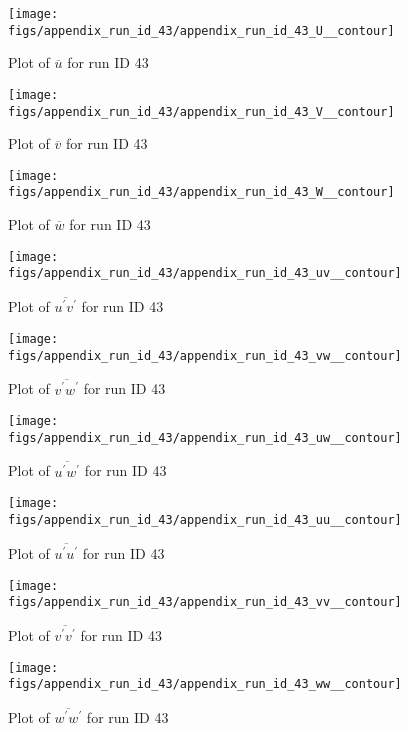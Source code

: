 \begin{figure}[H]
\centering
\texttt{[image: figs/appendix\_run\_id\_43/appendix\_run\_id\_43\_U\_\_contour]}
\caption{Plot of $\overline{u}$ for run ID 43}
\label{fig:appendix_run_id_43_U__contour}
\end{figure}


\begin{figure}[H]
\centering
\texttt{[image: figs/appendix\_run\_id\_43/appendix\_run\_id\_43\_V\_\_contour]}
\caption{Plot of $\overline{v}$ for run ID 43}
\label{fig:appendix_run_id_43_V__contour}
\end{figure}


\begin{figure}[H]
\centering
\texttt{[image: figs/appendix\_run\_id\_43/appendix\_run\_id\_43\_W\_\_contour]}
\caption{Plot of $\overline{w}$ for run ID 43}
\label{fig:appendix_run_id_43_W__contour}
\end{figure}


\begin{figure}[H]
\centering
\texttt{[image: figs/appendix\_run\_id\_43/appendix\_run\_id\_43\_uv\_\_contour]}
\caption{Plot of $\overline{u^\prime v^\prime}$ for run ID 43}
\label{fig:appendix_run_id_43_uv__contour}
\end{figure}


\begin{figure}[H]
\centering
\texttt{[image: figs/appendix\_run\_id\_43/appendix\_run\_id\_43\_vw\_\_contour]}
\caption{Plot of $\overline{v^\prime w^\prime}$ for run ID 43}
\label{fig:appendix_run_id_43_vw__contour}
\end{figure}


\begin{figure}[H]
\centering
\texttt{[image: figs/appendix\_run\_id\_43/appendix\_run\_id\_43\_uw\_\_contour]}
\caption{Plot of $\overline{u^\prime w^\prime}$ for run ID 43}
\label{fig:appendix_run_id_43_uw__contour}
\end{figure}


\begin{figure}[H]
\centering
\texttt{[image: figs/appendix\_run\_id\_43/appendix\_run\_id\_43\_uu\_\_contour]}
\caption{Plot of $\overline{u^\prime u^\prime}$ for run ID 43}
\label{fig:appendix_run_id_43_uu__contour}
\end{figure}


\begin{figure}[H]
\centering
\texttt{[image: figs/appendix\_run\_id\_43/appendix\_run\_id\_43\_vv\_\_contour]}
\caption{Plot of $\overline{v^\prime v^\prime}$ for run ID 43}
\label{fig:appendix_run_id_43_vv__contour}
\end{figure}


\begin{figure}[H]
\centering
\texttt{[image: figs/appendix\_run\_id\_43/appendix\_run\_id\_43\_ww\_\_contour]}
\caption{Plot of $\overline{w^\prime w^\prime}$ for run ID 43}
\label{fig:appendix_run_id_43_ww__contour}
\end{figure}


